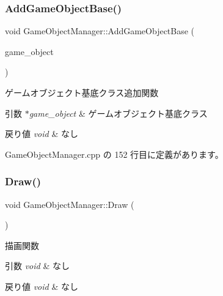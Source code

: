 \subsubsection{\texorpdfstring{Add\+Game\+Object\+Base()}{AddGameObjectBase()}}
{\footnotesize\ttfamily void Game\+Object\+Manager\+::\+Add\+Game\+Object\+Base (\begin{DoxyParamCaption}\item[{\mbox{\hyperlink{class_game_object_base}{Game\+Object\+Base}} $\ast$}]{game\+\_\+object }\end{DoxyParamCaption})}



ゲームオブジェクト基底クラス追加関数 


\begin{DoxyParams}{引数}
{\em $\ast$game\+\_\+object} & ゲームオブジェクト基底クラス \\
\hline
\end{DoxyParams}

\begin{DoxyRetVals}{戻り値}
{\em void} & なし \\
\hline
\end{DoxyRetVals}


 Game\+Object\+Manager.\+cpp の 152 行目に定義があります。

\mbox{\label{class_game_object_manager_a0549bd4b6575ee28803c0ff8fd2be2ee}} 
\subsubsection{\texorpdfstring{Draw()}{Draw()}}
{\footnotesize\ttfamily void Game\+Object\+Manager\+::\+Draw (\begin{DoxyParamCaption}{ }\end{DoxyParamCaption})}



描画関数 


\begin{DoxyParams}{引数}
{\em void} & なし \\
\hline
\end{DoxyParams}

\begin{DoxyRetVals}{戻り値}
{\em void} & なし \\
\hline
\end{DoxyRetVals}


